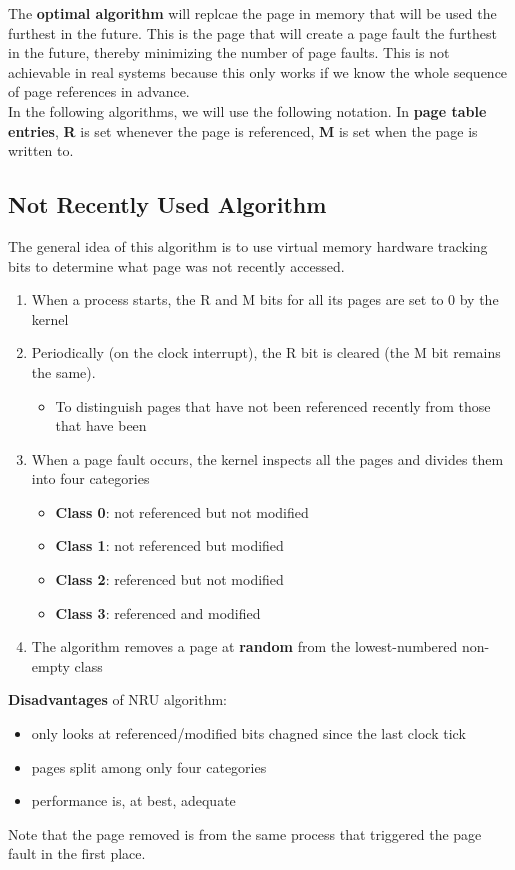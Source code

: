 \documentclass{article}
\newcommand{\bold}[1]{\textbf{#1}}
\renewcommand{\b}{\item[$\circ$]}
\newcommand{\newlist}{\begin{itemize}}
\renewcommand{\endlist}{\end{itemize}}
\begin{document}
The \bold{optimal algorithm} will replcae the page in memory that will be used the furthest in the future. This is the page that will create a page fault the furthest in the future, thereby minimizing the number of page faults. This is not achievable in real systems because this only works if we know the whole sequence of page references in advance. \\ 

In the following algorithms, we will use the following notation. In \bold{page table entries}, \bold{R} is set whenever the page is referenced, \bold{M} is set when the page is written to. 

\subsection{Not Recently Used Algorithm}

The general idea of this algorithm is to use virtual memory hardware tracking bits to determine what page was not recently accessed. 

\begin{enumerate}
    \item When a process starts, the R and M bits for all its pages are set to 0 by the kernel
    \item Periodically (on the clock interrupt), the R bit is cleared (the M bit remains the same). 
        \newlist 
        \b To distinguish pages that have not been referenced recently from those that have been 
        \endlist
    \item When a page fault occurs, the kernel inspects all the pages and divides them into four categories
        \newlist 
        \b \bold{Class 0}: not referenced but not modified
        \b \bold{Class 1}: not referenced but modified
        \b \bold{Class 2}: referenced but not modified
        \b \bold{Class 3}: referenced and modified
        \endlist
    \item The algorithm removes a page at \bold{random} from the lowest-numbered non-empty class
\end{enumerate}

\bold{Disadvantages} of NRU algorithm: \\ 
\newlist 
\b only looks at referenced/modified bits chagned since the last clock tick
\b pages split among only four categories
\b performance is, at best, adequate
\endlist

Note that the page removed is from the same process that triggered the page fault in the first place. 
\end{document}
